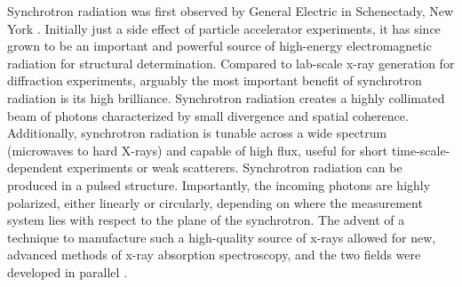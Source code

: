 

Synchrotron radiation was first observed by General Electric in Schenectady, New York \cite{firstSynchrotronRadPaper}. Initially just a side effect of particle accelerator experiments, it has since grown to be an important and powerful source of high-energy electromagnetic radiation for structural determination. Compared to lab-scale x-ray generation for diffraction experiments, arguably the most important benefit of synchrotron radiation is its high brilliance. Synchrotron radiation creates a highly collimated beam of photons characterized by small divergence and spatial coherence. Additionally, synchrotron radiation is tunable across a wide spectrum (microwaves to hard X-rays) and capable of high flux, useful for short time-scale-dependent experiments or weak scatterers. Synchrotron radiation can be produced in a pulsed structure. Importantly, the incoming photons are highly polarized, either linearly or circularly, depending on where the measurement system lies with respect to the plane of the synchrotron. The advent of a technique to manufacture such a high-quality source of x-rays allowed for new, advanced methods of x-ray absorption spectroscopy, and the two fields were developed in parallel \cite{synchrotronbook}. 

